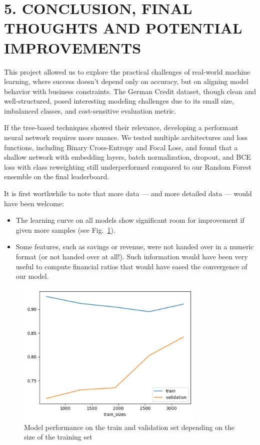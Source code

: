 \documentclass[12pt]{report}
\begin{document}
\section*{5. CONCLUSION, FINAL THOUGHTS AND POTENTIAL IMPROVEMENTS}

This project allowed us to explore the practical challenges of real-world machine learning, where success doesn't depend only on accuracy, but on aligning model behavior with business constraints. The German Credit dataset, though clean and well-structured, posed interesting modeling challenges due to its small size, imbalanced classes, and cost-sensitive evaluation metric.

If the tree-based techniques showed their relevance, developing a performant neural network requires more nuance. We tested multiple architectures and loss functions, including Binary Cross-Entropy and Focal Loss, and found that a shallow network with embedding layers, batch normalization, dropout, and BCE loss with class reweighting still underperformed compared to our Random Forest ensemble on the final leaderboard.

It is first worthwhile to note that more data — and more detailed data — would have been welcome:
\begin{itemize}
    \item The learning curve on all models show significant room for improvement if given more samples (see Fig.~\ref{fig:dataset_size}). 
    \item Some features, such as savings or revenue, were not handed over in a numeric format (or not handed over at all!). Such information would have been very useful to compute financial ratios that would have eased the convergence of our model.
\end{itemize}

\begin{figure}[htbp]
    \centering
    \includegraphics[width=0.8\textwidth]{dataset_size.png}
    \caption{Model performance on the train and validation set depending on the size of the training set}
    \label{fig:dataset_size}
\end{figure}
\end{document}
